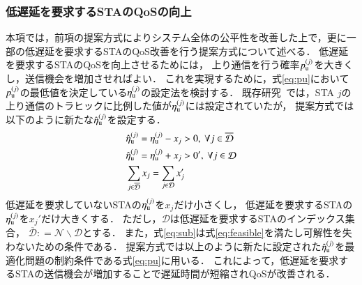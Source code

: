 \documentclass[master]{kuisthesis}		%
\newcommand{\etau}{\eta_{\rm u}^{(j)}}
\def\equiv{\mathrel{\mathop:}=}
\begin{document}
		\subsubsection{低遅延を要求するSTAのQoSの向上}\label{sec:qos}
			本項では，前項の提案方式によりシステム全体の公平性を改善した上で，更に一部の低遅延を要求するSTAのQoS改善を行う提案方式について述べる．
			低遅延を要求するSTAのQoSを向上させるためには，
			上り通信を行う確率$p_{\rm u}^{(j)}$を大きくし，送信機会を増加させればよい．
			これを実現するために，式\eqref{eq:pu}において$p_{\rm u}^{(j)}$の最低値を決定している$\etau$の設定法を検討する．
			既存研究~\cite{promac}では，STA $j$の上り通信のトラヒックに比例した値が$\etau$には設定されていたが，
			提案方式では以下のように新たな${\hat \eta}_{\rm u}^{(j)}$を設定する．
			\begin{align}
				&{\hat \eta}_{\rm u}^{(j)} = \etau -x_j>0,\ \forall j \in {\overline {\mathcal D}} \label{eq:new_etau_dbar}\\
				&{\hat \eta}_{\rm u}^{(j)} = \etau + x_j>0',\ \forall j \in {\mathcal D} \label{eq:new_etau_d}\\
				&\sum_{j\in{\overline {\mathcal D}}} x_j = \sum_{j\in{\mathcal D}} x_j' \label{eq:sub}
			\end{align}
			低遅延を要求していないSTAの$\etau$を$x_j$だけ小さくし，
			低遅延を要求するSTAの$\etau$を$x_j'$だけ大きくする．
			ただし，$\mathcal D$は低遅延を要求するSTAのインデックス集合，
			${\overline {\mathcal D}}\equiv{\mathcal N}\backslash{\mathcal D}$とする．
			また，式\eqref{eq:sub}は式\eqref{eq:feasible}を満たし可解性を失わないための条件である．
			提案方式では以上のように新たに設定された${\hat \eta}_{\rm u}^{(j)}$を最適化問題の制約条件である式\eqref{eq:pu}に用いる．
			これによって，低遅延を要求するSTAの送信機会が増加することで遅延時間が短縮されQoSが改善される．
\end{document}
